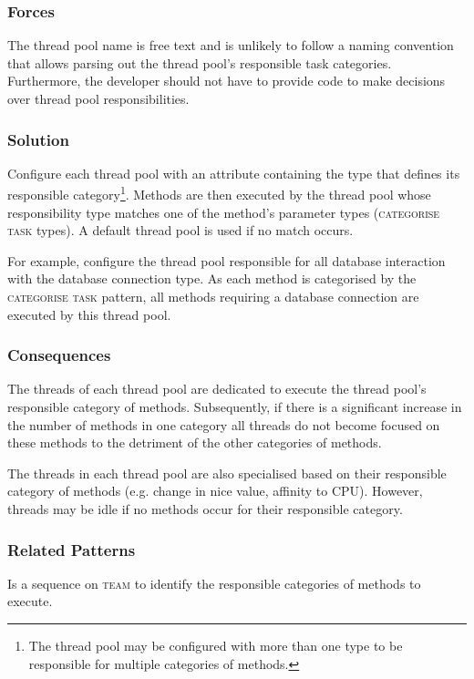 \documentclass[prodmode]{style/acmlarge}
\begin{document}
\subsubsection*{Forces} The thread pool name is free text and is unlikely to
follow a naming convention that allows parsing out the thread pool's responsible
task categories.  Furthermore, the developer should not have to provide code to
make decisions over thread pool responsibilities.

\subsubsection*{\textbf{Solution}} Configure each thread pool with an attribute
containing the type that defines its responsible category\footnote{The thread
pool may be configured with more than one type to be responsible for multiple
categories of methods.}.  Methods are then executed by the thread pool whose
responsibility type matches one of the method's parameter types
(\textsc{categorise task} types).  A default thread pool is used if no match
occurs.

For example, configure the thread pool responsible for all database interaction
with the database connection type.  As each method is categorised by the
\textsc{categorise task} pattern, all methods requiring a database connection
are executed by this thread pool.

\subsubsection*{Consequences} The threads of each thread pool are dedicated to
execute the thread pool's responsible category of methods.  Subsequently, if
there is a significant increase in the number of methods in one category all
threads do not become focused on these methods to the detriment of the other
categories of methods.

The threads in each thread pool are also specialised based on their responsible
category of methods (e.g. change in nice value, affinity to CPU).  However,
threads may be idle if no methods occur for their responsible category.

\subsubsection*{Related Patterns} Is a sequence on \textsc{team} to identify
the responsible categories of methods to execute.
\end{document}
